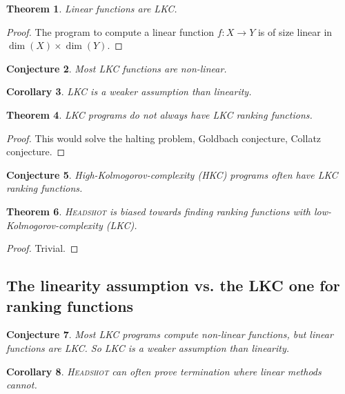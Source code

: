 \documentclass[preprint]{sigplanconf}
\newtheorem{theorem}{Theorem}
\newtheorem{corollary}[theorem]{Corollary}
\newtheorem{conjecture}[theorem]{Conjecture}
\theoremstyle{definition}
\begin{document}
\begin{theorem}
 Linear functions are LKC.
\end{theorem}

\begin{proof}
 The program to compute a linear function $f: X \to Y$ is of size linear in
 $\dim(X) \times \dim(Y)$.
\end{proof}


\begin{conjecture}
 Most LKC functions are non-linear.
\end{conjecture}

\begin{corollary}
 LKC is a weaker assumption than linearity.
\end{corollary}


\begin{theorem}
 LKC programs do not always have LKC ranking functions.
\end{theorem}

\begin{proof}
 This would solve the halting problem, Goldbach conjecture, Collatz conjecture.
\end{proof}

\begin{conjecture}
 High-Kolmogorov-complexity (HKC) programs often have LKC ranking functions.
\end{conjecture}

\begin{theorem}
 \textsc{Headshot} is biased towards finding ranking functions with
 low-Kolmogorov-complexity (LKC).
\end{theorem}

\begin{proof}
 Trivial.
\end{proof}

\subsection{The linearity assumption vs. the LKC one for ranking functions}

\begin{conjecture}
 Most LKC programs compute non-linear functions, but linear functions are LKC.
 So LKC is a weaker assumption than linearity.
\end{conjecture}

\begin{corollary}
 \textsc{Headshot} can often prove termination where linear methods cannot.
\end{corollary}
\end{document}
